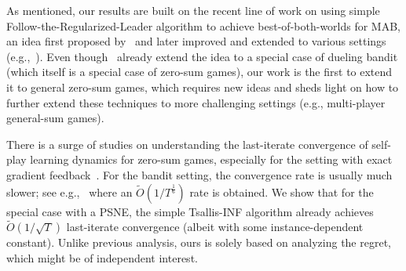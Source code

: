 As mentioned, our results are built on the recent line of work on using simple Follow-the-Regularized-Leader algorithm to achieve best-of-both-worlds for MAB, an idea first proposed by~\citet{wei2018more} and later improved and extended to various settings (e.g.,~\citealp{rouyer2020tsallis, jin2020simultaneously, jin2021best, zimmert2021tsallis, ito2021parameter,  erez2021towards, rouyer2021algorithm, ito2022nearly, amir2022better, masoudian2022best, tsuchiya2023best, jin2024improved, jin2024no}).
Even though~\citet{zimmert2021tsallis,saha2022versatile, saad2024weak} already extend the idea to a special case of dueling bandit (which itself is a special case of zero-sum games),
our work is the first to extend it to general zero-sum games, which requires new ideas and sheds light on how to further extend these techniques to more challenging settings (e.g., multi-player general-sum games).

There is a surge of studies on understanding the last-iterate convergence of self-play learning dynamics for zero-sum games, especially for the setting with exact gradient feedback~\citep{daskalakis2019last, mertikopoulos2019learning, golowich2020tight, wei2021linear, hsieh2021adaptive, gorbunov2022last, cai2022finite, cai2024fast, cai2024accelerated}.
For the bandit setting, the convergence rate is usually much slower; see e.g.,~\citet{cai2023uncoupled} where an $\tilde{O}(1/T^{\frac{1}{6}})$ rate is obtained.
We show that for the special case with a PSNE, the simple Tsallis-INF algorithm already achieves $\tilde{O}(1/\sqrt{T})$ last-iterate convergence (albeit with some instance-dependent constant).
Unlike previous analysis, ours is solely based on analyzing the regret, which might be of independent interest.
